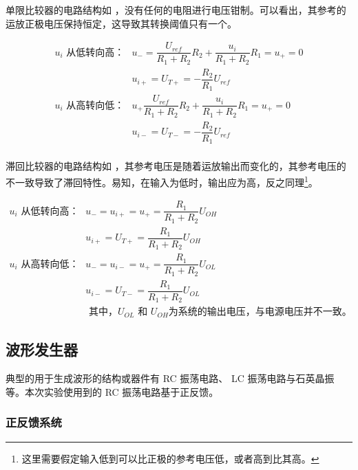 \documentclass[lang=cn,11pt,a4paper,cite=authoryear]{elegantpaper}
\begin{document}


单限比较器的电路结构如  ，没有任何的电阻进行电压钳制。可以看出，其参考的运放正极电压保持恒定，这导致其转换阈值只有一个。

\[
\begin{aligned}
    u_i \text{ 从低转向高：} & u_{-} = \dfrac{U_{ref}}{R_1 + R_2} R_2 + \dfrac{u_{i}}{R_1 + R_2} R_1 = u_{+} = 0\\  
    & u_{i+} = U_{T+} = -\dfrac{R_2}{R_1} U_{ref}\\ 
    u_i \text{ 从高转向低：} & u_{+} \dfrac{U_{ref}}{R_1 + R_2} R_2 + \dfrac{u_{i}}{R_1 + R_2} R_1 = u_{+} = 0\\ 
    & u_{i-} = U_{T-} = -\dfrac{R_2}{R_1} U_{ref}\\ 
\end{aligned}    
\]


滞回比较器的电路结构如  ，其参考电压是随着运放输出而变化的，其参考电压的不一致导致了滞回特性。易知，在输入为低时，输出应为高，反之同理\footnote{这里需要假定输入低到可以比正极的参考电压低，或者高到比其高。}。


\[
\begin{aligned}
    u_i \text{ 从低转向高：} & u_{-} = u_{i+} = u_{+} = \dfrac{R_1}{R_1 + R_2} U_{OH}\\  
    & u_{i+} = U_{T+} = \dfrac{R_1}{R_1 + R_2} U_{OH} \\ 
    u_i \text{ 从高转向低：} &  u_{-} = u_{i-} = u_{+} = \dfrac{R_1}{R_1 + R_2} U_{OL}\\ 
    & u_{i-} = U_{T-} = \dfrac{R_1}{R_1 + R_2} U_{OL} \\ 
    & \text{ 其中，} U_{OL} \text{ 和 } U_{OH} \text{为系统的输出电压，与电源电压并不一致。}
\end{aligned}    
\]


\subsection{波形发生器}

典型的用于生成波形的结构或器件有 RC 振荡电路、 LC 振荡电路与石英晶振等。本次实验使用到的 RC 振荡电路基于正反馈。

\subsubsection{正反馈系统}
\end{document}
